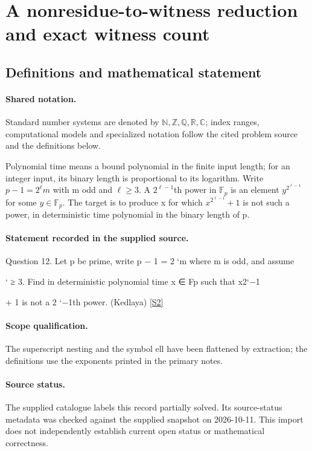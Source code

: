 \documentclass[11pt]{article}
\newcommand{\sref}[2]{\hyperlink{source:#1:#2}{[S#2]}}
\begin{document}
\section{A nonresidue-to-witness reduction and exact witness count}\label{statement}

\subsection{Definitions and mathematical statement}

\paragraph{Shared notation.}Standard number systems are denoted by $\mathbb N,\mathbb Z,\mathbb Q,\mathbb R,\mathbb C$; index ranges, computational models and specialized notation follow the cited problem source and the definitions below.


Polynomial time means a bound polynomial in the finite input length; for an integer input, its binary length is proportional to its logarithm. Write $p-1=2^\ell m$ with m odd and $\ell\ge3$. A $2^{\ell-1}$th power in $\mathbb F_p$ is an element $y^{2^{\ell-1}}$ for some $y\in\mathbb F_p$. The target is to produce x for which $x^{2^{\ell-1}}+1$ is not such a power, in deterministic time polynomial in the binary length of p.
\paragraph{Statement recorded in the supplied source.}
Question 12. Let p be prime, write p − 1 = 2 `m where m is odd, and assume

` ≥ 3. Find in deterministic polynomial time x ∈ Fp such that x2`−1

+ 1 is not a 2 `−1th power. (Kedlaya) \sref{statement}{2}
\paragraph{Scope qualification.}
The superscript nesting and the symbol ell have been flattened by extraction; the definitions use the exponents printed in the primary notes.
\paragraph{Source status.}
The supplied catalogue labels this record partially solved. Its source-status metadata was checked against the supplied snapshot on 2026-10-11. This import does not independently establish current open status or mathematical correctness.
\end{document}
